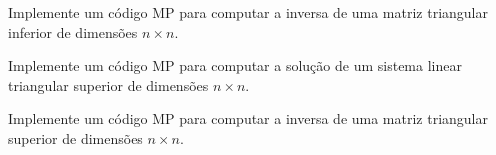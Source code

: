 \begin{exer}
  Implemente um código MP para computar a inversa de uma matriz triangular inferior de dimensões $n\times n$.
\end{exer}

\begin{exer}
  Implemente um código MP para computar a solução de um sistema linear triangular superior de dimensões $n\times n$.
\end{exer}

\begin{exer}
  Implemente um código MP para computar a inversa de uma matriz triangular superior de dimensões $n\times n$.
\end{exer}
